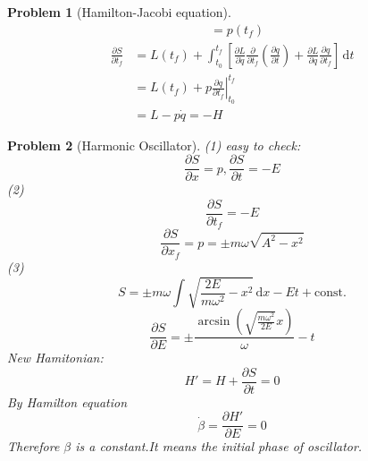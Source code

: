 \documentclass{article}
\theoremstyle{t}
\newtheorem{problem}{Problem}
\newcommand{\dd}{\mathrm{d}}
\newcommand{\pa}{\partial}
\begin{document}
\begin{problem}[Hamilton-Jacobi equation]
\begin{equation}
\begin{split}
    &=p(t_f)
\end{split}
\end{equation}
\begin{equation}
    \begin{split}
        \frac{\pa S}{\pa t_f}&=L(t_f)+\int_{t_0}^{t_f}\left[\frac{\pa L}{\pa \dot{q}}\frac{\pa}{\pa t_f}\left(\frac{\pa q}{\pa t}\right)+\frac{\pa L}{\pa q}\frac{\pa q}{\pa t_f}\right]\,\dd t\\
        &=L(t_f)+\left.p\frac{\pa q}{\pa t_f}\right|_{t_0}^{t_f}\\
        &=L-p\dot{q}=-H
    \end{split}
\end{equation}
\end{problem}

\begin{problem}[Harmonic Oscillator]
    (1) easy to check:
    \begin{equation}
        \frac{\pa S}{\pa x}=p,\frac{\pa S}{\pa t}=-E
    \end{equation}
    (2)\begin{equation}
        \frac{\pa S}{\pa t_f}=-E
    \end{equation}
    \begin{equation}
        \frac{\pa S}{\pa x_f}=p=\pm m \omega \sqrt{A^2-x^2}
    \end{equation}
    (3)
    \begin{equation}
        S=\pm m \omega \int \sqrt{\frac{2E}{m \omega^2}-x^2}\, \dd x-E t+\mathrm{const.}
    \end{equation}
    \begin{equation}
        \frac{\pa S}{\pa E}=\pm \frac{\arcsin (\sqrt{\frac{m \omega^2}{2E}}x)}{\omega}-t
    \end{equation}
    New Hamitonian:
    \begin{equation}
        H'=H+\frac{\pa S}{\pa t}=0
    \end{equation}
    By Hamilton equation
    \begin{equation}
        \dot{\beta}=\frac{\pa H'}{\pa E}=0
    \end{equation}
    Therefore $\beta$ is a constant.It means the initial phase of  oscillator.
\end{problem}
\end{document}
